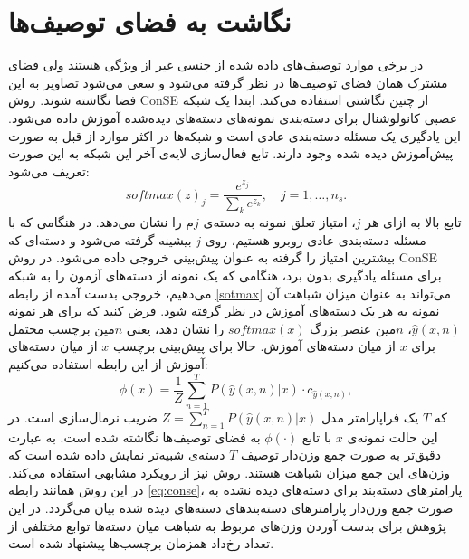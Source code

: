 \section{نگاشت به فضای توصیف‌ها}
در برخی موارد توصیف‌های داده شده از جنسی غیر از ویژگی هستند ولی فضای مشترک همان فضای توصیف‌ها در نظر گرفته می‌شود و سعی می‌شود تصاویر به این فضا نگاشته شوند.
روش ConSE
 \cite{convec} 
از چنین نگاشتی استفاده می‌کند.  ابتدا یک شبکه عصبی کانولوشنال برای دسته‌بندی نمونه‌های دسته‌های دیده‌شده آموزش داده می‌شود. این یادگیری یک مسئله دسته‌بندی عادی است و شبکه‌ها در اکثر موارد از قبل به صورت پیش‌آموزش دیده شده وجود دارند. تابع فعال‌سازی 
  لایه‌ی آخر این شبکه  به این صورت تعریف می‌شود:
 \begin{equation}
 \label{softmax}
 softmax(z)_j = \frac{e^{z_j}}{\sum_k e^{z_k}}, \quad j = 1, \ldots, n_s.
 \end{equation} 
 تابع بالا به ازای هر $j$، امتیاز تعلق نمونه به دسته‌ی $j$م را نشان می‌دهد. در هنگامی که با مسئله دسته‌بندی عادی روبرو هستیم، روی $j$ بیشینه گرفته می‌شود و دسته‌ای که بیشترین امتیاز را گرفته به عنوان پیش‌بینی خروجی داده می‌شود. در روش ConSE برای مسئله یادگیری بدون برد، هنگامی که یک نمونه از دسته‌های آزمون را به شبکه می‌دهیم، خروجی بدست آمده از رابطه \eqref{sotmax} می‌تواند به عنوان میزان شباهت آن نمونه به هر یک دسته‌های آموزش در نظر گرفته شود. 
  فرض کنید که برای هر نمونه
 $\hat{y}(x,n)$،
 $n$مین 
 عنصر بزرگ $softmax(x)$ را نشان دهد، یعنی $n$مین برچسب محتمل برای $x$ از میان دسته‌های آموزش. حالا برای پیش‌بینی برچسب $x$ از میان دسته‌های آموزش از این رابطه استفاده می‌کنیم:
 \begin{equation}
 \label{eq:conse}
 \phi(x) = \frac{1}{Z} \sum_{n=1}^T P(\hat{y}(x,n) | x) \cdot c_{\hat{y}(x,n)},
 \end{equation}
 که $T$ یک فراپارامتر مدل
 $Z = \sum_{n=1}^T P(\hat{y}(x,n) | x) $
 ضریب نرمال‌سازی است. در این حالت نمونه‌ی $x$ با تابع $\phi(\cdot)$ به فضای توصیف‌ها نگاشته شده است. به عبارت دقیق‌تر به صورت جمع وزن‌دار توصیف $T$ دسته‌ی شبیه‌تر نمایش داده شده است که وزن‌های این جمع میزان شباهت هستند. 
 روش 
 \cite{costa}
 نیز از رویکرد مشابهی استفاده می‌کند. در این روش همانند رابطه \eqref{eq:conse}، پارامترهای دسته‌بند برای دسته‌های دیده نشده به صورت جمع وزن‌دار پارامترهای دسته‌بندهای دسته‌های دیده شده بیان می‌گردد. در این پژوهش برای بدست آوردن وزن‌های مربوط به شباهت میان دسته‌ها توابع مختلفی از تعداد رخ‌داد همزمان برچسب‌ها پیشنهاد شده است.




